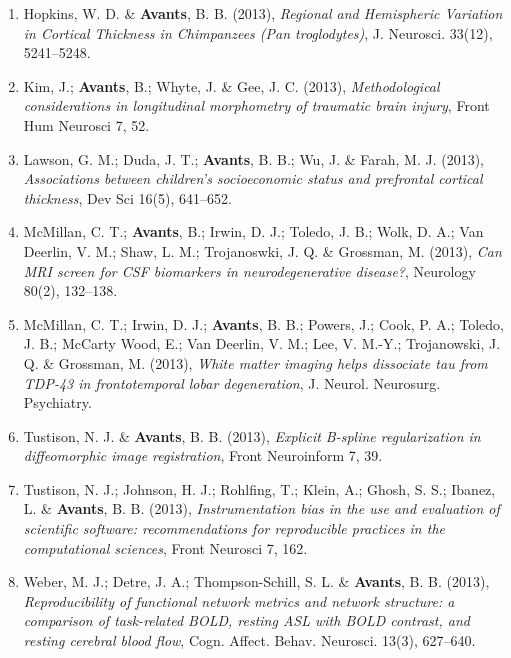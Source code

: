 \documentclass[11pt]{moderncv} %
\begin{document}
\begin{enumerate}
\item  Hopkins, W. D. \&  \textbf{Avants}, B. B. (2013), \textit{Regional and Hemispheric Variation in Cortical Thickness in Chimpanzees (Pan troglodytes)}, J. Neurosci. 33(12), 5241--5248.

\item  Kim, J.; \textbf{Avants}, B.; Whyte, J. \&  Gee, J. C. (2013), \textit{Methodological considerations in longitudinal morphometry of traumatic brain injury}, Front Hum Neurosci 7, 52.

\item  Lawson, G. M.; Duda, J. T.; \textbf{Avants}, B. B.; Wu, J. \&  Farah, M. J. (2013), \textit{Associations between children's socioeconomic status and prefrontal cortical thickness}, Dev Sci 16(5), 641--652.

\item  McMillan, C. T.; \textbf{Avants}, B.; Irwin, D. J.; Toledo, J. B.; Wolk, D. A.; Van Deerlin, V. M.; Shaw, L. M.; Trojanoswki, J. Q. \&  Grossman, M. (2013), \textit{Can MRI screen for CSF biomarkers in neurodegenerative disease?}, Neurology 80(2), 132--138.

\item  McMillan, C. T.; Irwin, D. J.; \textbf{Avants}, B. B.; Powers, J.; Cook, P. A.; Toledo, J. B.; McCarty Wood, E.; Van Deerlin, V. M.; Lee, V. M.-Y.; Trojanowski, J. Q. \&  Grossman, M. (2013), \textit{White matter imaging helps dissociate tau from TDP-43 in frontotemporal lobar degeneration}, J. Neurol. Neurosurg. Psychiatry.

\item  Tustison, N. J. \&  \textbf{Avants}, B. B. (2013), \textit{Explicit B-spline regularization in diffeomorphic image registration}, Front Neuroinform 7, 39.

\item  Tustison, N. J.; Johnson, H. J.; Rohlfing, T.; Klein, A.; Ghosh, S. S.; Ibanez, L. \&  \textbf{Avants}, B. B. (2013), \textit{Instrumentation bias in the use and evaluation of scientific software: recommendations for reproducible practices in the computational sciences}, Front Neurosci 7, 162.

\item  Weber, M. J.; Detre, J. A.; Thompson-Schill, S. L. \&  \textbf{Avants}, B. B. (2013), \textit{Reproducibility of functional network metrics and network structure: a comparison of task-related BOLD, resting ASL with BOLD contrast, and resting cerebral blood flow}, Cogn. Affect. Behav. Neurosci. 13(3), 627--640.


\end{enumerate}
\end{document}
